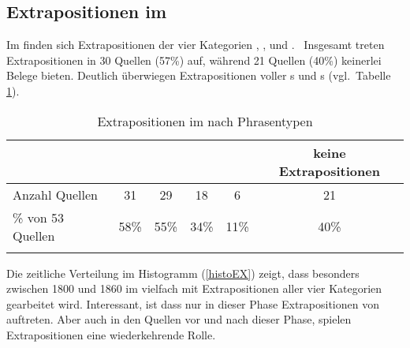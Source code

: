  

 
  \subsection{Extrapositionen im \hai{{\LiJi}}}\label{Extrapositionenqualitativ}
 Im  finden sich Extrapositionen der vier Kategorien \hai{{\NP}}, \hai{{\PP}}, \hai{{\AP}} und \hai{{\AdvP}}. \,%
 Insgesamt treten Extrapositionen in 30 Quellen (57\%) auf, während 21 Quellen (40\%) keinerlei Belege bieten. Deutlich überwiegen Extrapositionen voller \hai{{\NP}}s und \hai{{\PP}}s (vgl.\, Tabelle \ref{tblEXall}). 
    
   \begin{table}
   \centering
\begin{tabular}{lccccc}
\lsptoprule
 & \hai{{\NP}} & \hai{{\PP}} & \hai{{\AP}} & \hai{{\AdvP}} & keine Extrapositionen \\ 
\midrule
Anzahl Quellen & 31 & 29 & 18 & 6 & 21\\
\% von 53 Quellen & 58\% & 55\% & 34\% & 11\% & 40\% \\
\lspbottomrule
 \end{tabular}
 \caption{Extrapositionen im  nach Phrasentypen}
  \label{tblEXall}
 \end{table}
  
  
  
  Die zeitliche Verteilung im Histogramm (\ref{histoEX}) zeigt, dass besonders zwischen 1800 und 1860 im  vielfach mit Extrapositionen aller vier Kategorien gearbeitet wird. Interessant, ist dass nur in dieser Phase Extrapositionen von \hai{{\AdvP}} \,%
  auftreten. Aber auch in den Quellen vor und nach dieser Phase, spielen Extrapositionen eine wiederkehrende Rolle. 
  

